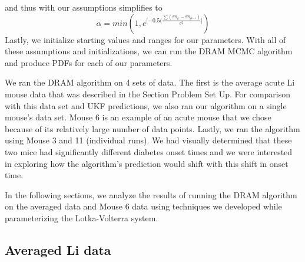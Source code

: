 \documentclass{article}
\begin{document}
and thus with our assumptions simplifies to 
\begin{equation} \label{eq:22mcmc}
\alpha = min(1, e^{[ {-0.5(\frac{\sum (SS_{\theta^*}-SS_{\theta^{k-1}})}{\sigma^2}]}})
\end{equation}
Lastly, we initialize starting values and ranges for our parameters.
With all of these assumptions and initializations, we can run the DRAM MCMC algorithm and produce PDFs for each of our parameters.
\par We ran the DRAM algorithm on 4 sets of data. The first is the average acute Li mouse data that was described in the Section Problem Set Up. For comparison with this data set and UKF predictions, we also ran our algorithm on a single mouse's data set. Mouse 6 is an example of an acute mouse that we chose because of its relatively large number of data points. Lastly, we ran the algorithm using Mouse 3 and 11 (individual runs). We had visually determined that these two mice had significantly different diabetes onset times and we were interested in exploring how the algorithm's prediction would shift with this shift in onset time. 
\par In the following sections, we analyze the results of running the DRAM algorithm on the averaged data and Mouse 6 data using techniques we developed while parameterizing the Lotka-Volterra system.
\subsection{Averaged Li data}
\end{document}
